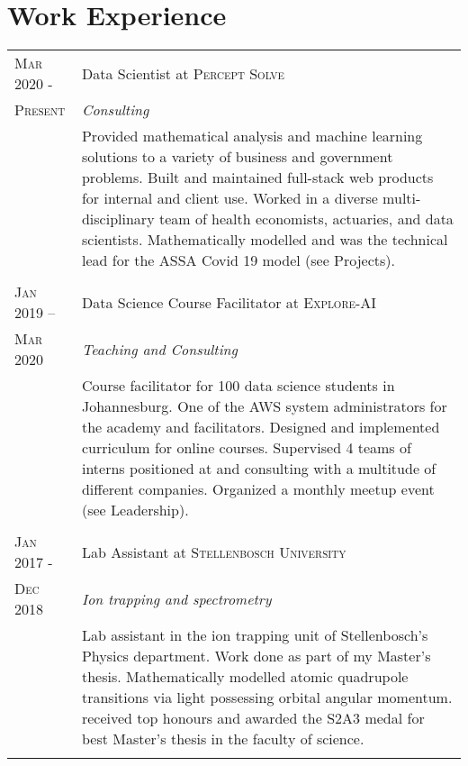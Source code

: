 \section{Work Experience}

\begin{supertabular}{p{1.8cm}|p{12cm}}
	\textsc{Mar 2020 -}  		& Data Scientist at \textsc{Percept Solve} \\
	\textsc{Present}			& \emph{Consulting} \\
								& \footnotesize{Provided mathematical analysis and machine learning solutions to a variety of business and government problems. Built and maintained full-stack web products for internal and client use. Worked in a diverse multi-disciplinary team of health economists, actuaries, and data scientists. Mathematically modelled and was the technical lead for the ASSA Covid 19 model (see Projects).} \\
	 \\
	\textsc{Jan 2019 --}  		& Data Science Course Facilitator at \textsc{Explore-AI} \\
	\textsc{Mar 2020}			& \emph{Teaching and Consulting} \\
								& \footnotesize{Course facilitator for 100 data science students in Johannesburg. One of the AWS system administrators for the academy and facilitators. Designed and implemented curriculum for online courses. Supervised 4 teams of interns positioned at and consulting with a multitude of different companies. Organized a monthly meetup event (see Leadership).} \\
	 \\
	\textsc{Jan 2017 -}  		& Lab Assistant at \textsc{Stellenbosch University} \\
	\textsc{Dec 2018}			& \emph{Ion trapping and spectrometry} \\
								& \footnotesize{Lab assistant in the ion trapping unit of Stellenbosch's Physics department. Work done as part of my Master's thesis. Mathematically modelled atomic quadrupole transitions via light possessing orbital angular momentum. received top honours and awarded the S2A3 medal for best Master's thesis in the faculty of science.} \\
	 \\

\end{supertabular}
